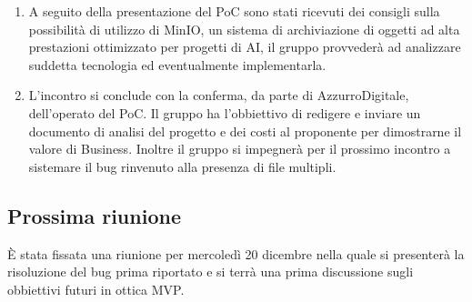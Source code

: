 \begin{enumerate}
    \item A seguito della presentazione del PoC sono stati ricevuti dei consigli sulla possibilità di utilizzo di MinIO, un sistema di archiviazione di oggetti ad alta prestazioni ottimizzato per progetti di AI, il gruppo provvederà ad analizzare suddetta tecnologia ed eventualmente implementarla.
    \item L'incontro si conclude con la conferma, da parte di AzzurroDigitale, dell'operato del PoC. Il gruppo ha l'obbiettivo di redigere e inviare un documento di analisi del progetto e dei costi al proponente per dimostrarne il valore di Business. Inoltre il gruppo si impegnerà per il prossimo incontro a sistemare il bug rinvenuto alla presenza di file multipli. 
\end{enumerate}

\subsection{Prossima riunione} \label{subsec:riunione}
È stata fissata una riunione per mercoledì 20 dicembre nella quale si presenterà la risoluzione del bug prima riportato e si terrà una prima discussione sugli obbiettivi futuri in ottica MVP.
